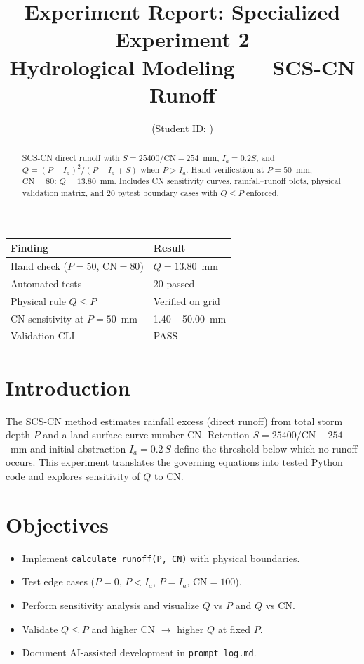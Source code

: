\documentclass[11pt,a4paper]{article}
\title{Experiment Report: Specialized Experiment 2\\Hydrological Modeling --- SCS-CN Runoff}
\author{\studentname \quad (Student ID: \studentid)}
\date{\reportdate}
\begin{document}
\maketitle

\begin{abstract}
SCS-CN direct runoff with $S=25400/\mathrm{CN}-254$~mm, $I_a=0.2S$, and $Q=(P-I_a)^2/(P-I_a+S)$ when $P>I_a$. Hand verification at $P=50$~mm, $\mathrm{CN}=80$: $Q=13.80$~mm. Includes CN sensitivity curves, rainfall--runoff plots, physical validation matrix, and 20 pytest boundary cases with $Q\le P$ enforced.
\end{abstract}

\begin{tcolorbox}[
  colback=blue!4,
  colframe=blue!55!black,
  title=\textbf{Key Findings (Executive Summary)},
  fonttitle=\bfseries,
  arc=2mm,
]
\begin{tabular}{@{}ll@{}}
\textbf{Finding} & \textbf{Result} \\
\hline
Hand check ($P=50$, $\mathrm{CN}=80$) & $Q = 13.80$~mm \\
Automated tests & 20 passed \\
Physical rule $Q \le P$ & Verified on grid \\
CN sensitivity at $P=50$~mm & 1.40 -- 50.00~mm \\
Validation CLI & PASS \\
\end{tabular}
\end{tcolorbox}

\section{Introduction}
The SCS-CN method estimates rainfall excess (direct runoff) from total storm depth $P$ and a land-surface curve number $\mathrm{CN}$. Retention $S = 25400/\mathrm{CN} - 254$~mm and initial abstraction $I_a = 0.2\,S$ define the threshold below which no runoff occurs. This experiment translates the governing equations into tested Python code and explores sensitivity of $Q$ to $\mathrm{CN}$.

\section{Objectives}
\begin{itemize}[noitemsep]
  \item Implement \texttt{calculate\_runoff(P, CN)} with physical boundaries.
  \item Test edge cases ($P=0$, $P < I_a$, $P = I_a$, $\mathrm{CN}=100$).
  \item Perform sensitivity analysis and visualize $Q$ vs $P$ and $Q$ vs $\mathrm{CN}$.
  \item Validate $Q \le P$ and higher $\mathrm{CN}$ $\rightarrow$ higher $Q$ at fixed $P$.
  \item Document AI-assisted development in \texttt{prompt\_log.md}.
\end{itemize}
\end{document}
